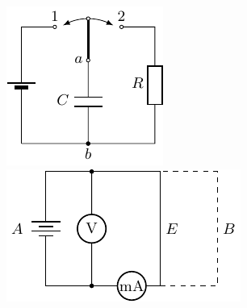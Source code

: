 \begin{figure}[htbp]
    \centering
    \begin{minipage}[t]{0.48\textwidth}
        \centering
        \includegraphics{fig/B/7-41.pdf}
        \caption{}\label{fig_B_7-41}
    \end{minipage}
    \begin{minipage}[t]{0.48\textwidth}
        \centering
        \includegraphics{fig/B/7-42.pdf}
        \caption{}\label{fig_B_7-42}
    \end{minipage}
\end{figure}



